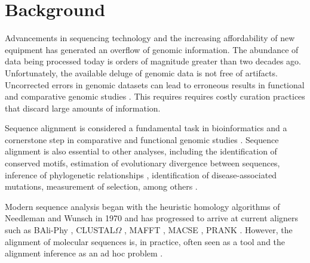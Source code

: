 \section{Background}


Advancements in sequencing technology and the increasing affordability of new
equipment has generated an overflow of genomic information.
The abundance of data being processed today is orders of magnitude greater than
two decades ago. %
Unfortunately, the available deluge of genomic data is not free of artifacts.
Uncorrected errors in genomic datasets can lead to erroneous results in
functional and comparative genomic studies \parencite{estimates_schneider_2009}.
This requires requires costly curation practices that discard large amounts of
information.

Sequence alignment is considered a fundamental task in bioinformatics and a
cornerstone step in comparative and functional genomic studies
\parencite{sequence_alignment_rosenberg_2009}.
Sequence alignment is also essential to other analyses, including the
identification of conserved motifs, estimation of evolutionary divergence
between sequences, inference of phylogenetic relationships
\parencite{MSA_kumar_2007}, identification of disease-associated mutations,
measurement of selection, among others
\parencite{sequence_alignment_rosenberg_2009}.

Modern sequence analysis began with the heuristic homology algorithms of
Needleman and Wunsch in 1970 \parencite{identification_smith_1981} and has
progressed to arrive at current aligners such as BAli-Phy \parencite{suchard_baliphy_2006},
CLUSTAL$\Omega$ \parencite{clustal_omega_sievers_2011}, MAFFT \parencite{mafft_katoh_2002},
MACSE \parencite{ranwez_macse_2011}, PRANK \parencite{prank_loytynoja_2014}.
However, the alignment of molecular sequences is, in practice, often seen as a
tool and the alignment inference as an ad hoc problem
\parencite{morrison_MSA_2018}.

